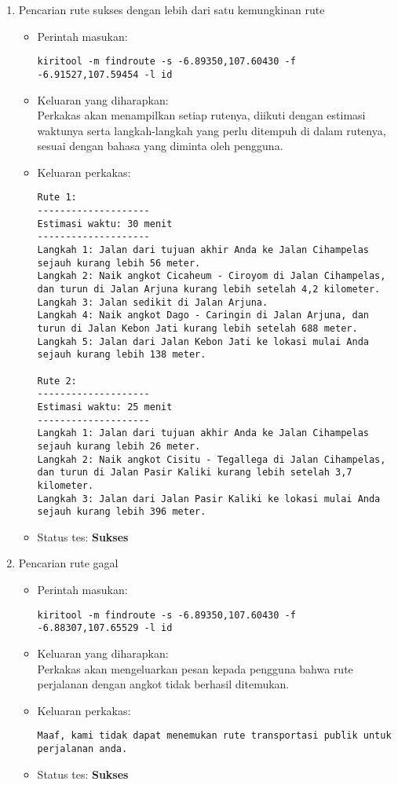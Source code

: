 \begin{enumerate}
	\item Pencarian rute sukses dengan lebih dari satu kemungkinan rute
	\begin{itemize}
		\item Perintah masukan:
		\begin{verbatim}
kiritool -m findroute -s -6.89350,107.60430 -f -6.91527,107.59454 -l id
		\end{verbatim}
		\item Keluaran yang diharapkan: \\
		Perkakas akan menampilkan setiap rutenya, diikuti dengan estimasi waktunya serta langkah-langkah yang perlu ditempuh di dalam rutenya, sesuai dengan bahasa yang diminta oleh pengguna.
		\item Keluaran perkakas:
		\begin{lstlisting}
Rute 1:
--------------------
Estimasi waktu: 30 menit 
--------------------
Langkah 1: Jalan dari tujuan akhir Anda ke Jalan Cihampelas sejauh kurang lebih 56 meter.
Langkah 2: Naik angkot Cicaheum - Ciroyom di Jalan Cihampelas, dan turun di Jalan Arjuna kurang lebih setelah 4,2 kilometer.
Langkah 3: Jalan sedikit di Jalan Arjuna.
Langkah 4: Naik angkot Dago - Caringin di Jalan Arjuna, dan turun di Jalan Kebon Jati kurang lebih setelah 688 meter.
Langkah 5: Jalan dari Jalan Kebon Jati ke lokasi mulai Anda sejauh kurang lebih 138 meter.

Rute 2:
--------------------
Estimasi waktu: 25 menit 
--------------------
Langkah 1: Jalan dari tujuan akhir Anda ke Jalan Cihampelas sejauh kurang lebih 26 meter.
Langkah 2: Naik angkot Cisitu - Tegallega di Jalan Cihampelas, dan turun di Jalan Pasir Kaliki kurang lebih setelah 3,7 kilometer.
Langkah 3: Jalan dari Jalan Pasir Kaliki ke lokasi mulai Anda sejauh kurang lebih 396 meter.
		\end{lstlisting}
		\item Status tes: \textbf{Sukses}
	\end{itemize}
	
	\item Pencarian rute gagal
	\begin{itemize}
		\item Perintah masukan:
		\begin{verbatim}
kiritool -m findroute -s -6.89350,107.60430 -f -6.88307,107.65529 -l id
		\end{verbatim}
		\item Keluaran yang diharapkan: \\
		Perkakas akan mengeluarkan pesan kepada pengguna bahwa rute perjalanan dengan angkot tidak berhasil ditemukan.
		\item Keluaran perkakas:
		\begin{lstlisting}
Maaf, kami tidak dapat menemukan rute transportasi publik untuk perjalanan anda.
		\end{lstlisting}
		\item Status tes: \textbf{Sukses}
	\end{itemize}
	

\end{enumerate}
